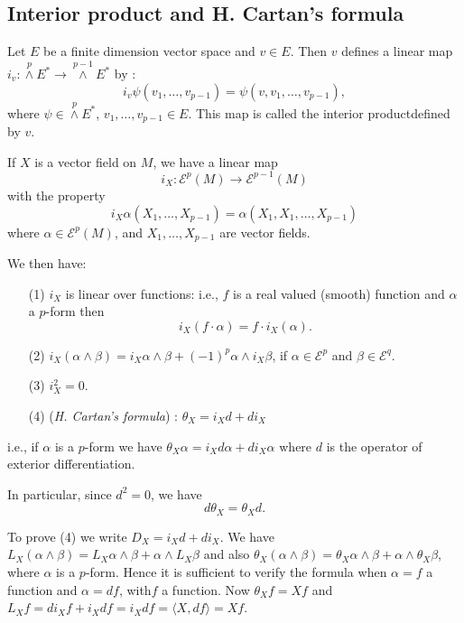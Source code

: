\subsection*{Interior product and H. Cartan's formula}

Let $E$ be a finite dimension vector space and $v\in E$. Then $v$ defines a linear map $i_{v}:{\displaystyle{\mathop{\wedge}\limits^{p}}}E^{*}\to {\displaystyle{\mathop{\wedge}\limits^{p-1}}}E^{*}$ by :
$$
i_{v}\psi(v_{1},\ldots,v_{p-1})=\psi(v,v_{1},\ldots,v_{p-1}),
$$
where $\psi\in {\displaystyle{\mathop{\wedge}\limits^{p}}} E^{*}$, $v_{1},\ldots,v_{p-1}\in E$. This map is called the interior product\pageoriginale defined by $v$.

If $X$ is a vector field on $M$, we have a linear map
$$
i_{X}:\mathscr{E}^{p}(M)\to \mathscr{E}^{p-1}(M)
$$
with the property
$$
i_{X}\alpha(X_{1},\ldots,X_{p-1})=\alpha(X_{1},X_{1},\ldots,X_{p-1})
$$
where $\alpha\in \mathscr{E}^{p}(M)$, and $X_{1},\ldots,X_{p-1}$ are vector fields.

We then have:
\begin{itemize}
\item[(1)] $i_{X}$ is linear over functions: i.e., $f$ is a real valued (smooth) function and $\alpha$ a $p$-form then
$$
i_{X}(f\cdot \alpha)=f\cdot i_{X}(\alpha).
$$

\item[(2)] $i_{X}(\alpha\wedge\beta)=i_{X}\alpha\wedge \beta+(-1)^{p}\alpha\wedge i_{X}\beta$, if $\alpha\in \mathscr{E}^{p}$ and $\beta\in \mathscr{E}^{q}$.

\item[(3)] $i^{2}_{X}=0$.

\item[(4)] ({\em H. Cartan's formula}) : $\theta_{X}=i_{X}d+di_{X}$
\end{itemize}
i.e., if $\alpha$ is a $p$-form we have $\theta_{X}\alpha=i_{X}d\alpha+di_{X}\alpha$ where $d$ is the operator of exterior differentiation.

In particular, since $d^{2}=0$, we have
$$
d\theta_{X}=\theta_{X}d.
$$

To prove (4) we write $D_{X}=i_{X}d+di_{X}$. We have $L_{X}(\alpha \wedge \beta)=L_{X}\alpha\wedge \beta+\alpha\wedge L_{X}\beta$ and also $\theta_{X}(\alpha\wedge \beta)=\theta_{X}\alpha\wedge\beta+\alpha\wedge\theta_{X}\beta$, where $\alpha$ is a $p$-form. Hence it is sufficient to verify the formula when $\alpha=f$ a function and $\alpha=df$, with\pageoriginale $f$ a function. Now $\theta_{X}f=Xf$ and $L_{X}f=di_{X}f+i_{X}df=i_{X}df=\langle X,df\rangle=Xf$.

